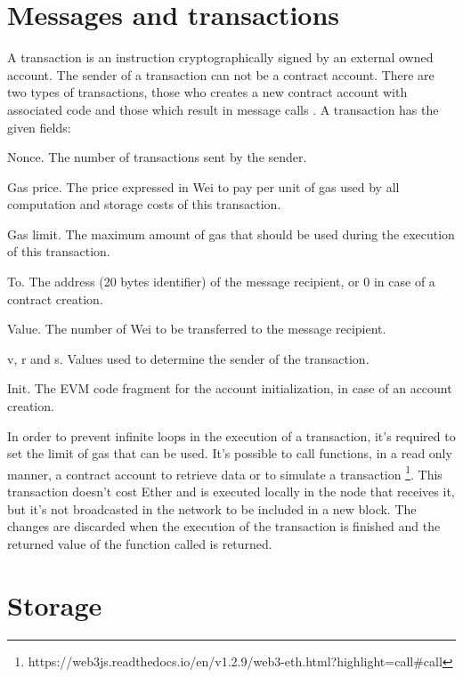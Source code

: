 \documentclass[
    article, 
    12pt,				%
	oneside,			%
	a4paper,			%
	chapter=TITLE,		%
	section=TITLE,		%
	english,			%
	english,				%
	sumario=tradicional
]{abntex2}
\begin{document}
\section{Messages and transactions}

A transaction is an instruction cryptographically signed by an external owned account. 
The sender of a transaction can not be a contract account.
There are two types of transactions, those who creates a new contract account with associated code and those which result in message calls \cite{wood_ethereum_2021}.
A transaction has the given fields:

\begin{alineas}
  \item Nonce. The number of transactions sent by the sender.
  \item Gas price. The price expressed in Wei to pay per unit of gas used by all computation and storage costs of this transaction.
  \item Gas limit. The maximum amount of gas that should be used during the execution of this transaction.
  \item To. The address (20 bytes identifier) of the message recipient, or 0 in case of a contract creation.
  \item Value. The number of Wei to be transferred to the message recipient.
  \item v, r and s. Values used to determine the sender of the transaction.
  \item Init. The EVM code fragment for the account initialization, in case of an account creation.
\end{alineas}

In order to prevent infinite loops in the execution of a transaction, it's required to set the limit of gas that can be used.
It's possible to call functions, in a read only manner, a contract account to retrieve data or to simulate a transaction \footnote{https://web3js.readthedocs.io/en/v1.2.9/web3-eth.html?highlight=call\#call}.
This transaction doesn't cost Ether and is executed locally in the node that receives it, but it's not broadcasted in the network to be included in a new block.
The changes are discarded when the execution of the transaction is finished and the returned value of the function called is returned.

\section{Storage}
\end{document}
